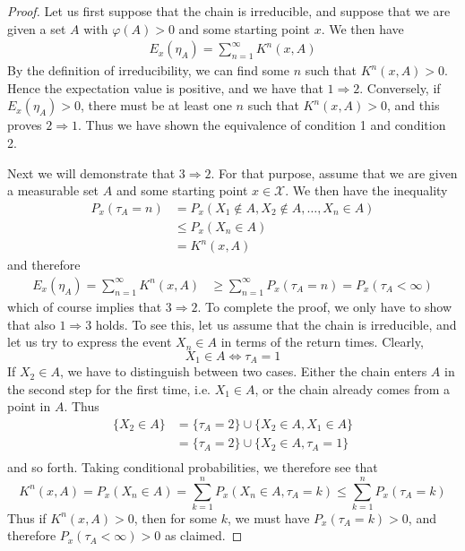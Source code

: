 \documentclass[a4paper, draft]{article}
\theoremstyle{own}
\theoremstyle{remark}
\begin{document}
\begin{proof}
	Let us first suppose that the chain is irreducible, and suppose that we are given a set $A$ with $\varphi(A) > 0$ and some starting point $x$. We then have
	\begin{align*}
	E_x(\eta_A) = \sum_{n=1}^\infty K^n(x,A)
	\end{align*}
	By the definition of irreducibility, we can find some $n$ such that $K^n(x,A) > 0$. Hence the expectation value is positive, and we have that $1 \Rightarrow 2$. Conversely,  if $E_x(\eta_A) > 0$, there must be at least one $n$ such that $K^n(x,A) > 0$, and this proves $2 \Rightarrow 1$. Thus we have shown the equivalence of condition 1 and condition 2.
	
	Next we will demonstrate that $3 \Rightarrow 2$. For that purpose, assume that we are given a measurable set $A$ and some starting point $x \in {\mathcal X}$. We then have the inequality
	\begin{align*}
	P_x(\tau_A = n) &= P_x(X_1 \notin A, X_2 \notin A, \dots, X_n \in A) \\
	& \leq P_x(X_n \in A) \\ &= K^n(x,A)
	\end{align*}
	and therefore
	\begin{align*}
	E_x(\eta_A) = \sum_{n=1}^\infty K^n(x,A) & \geq \sum_{n=1}^\infty  P_x(\tau_A = n) = P_x(\tau_A <\infty)
	\end{align*}
	which of course implies that $3 \Rightarrow 2$. To complete the proof, we only have to show that also $1 \Rightarrow 3$ holds. To see this, let us assume that the chain is irreducible, and let us try to express the event $X_n \in A$ in terms of the return times. Clearly,
	$$
	X_1 \in A \Leftrightarrow \tau_A = 1
	$$
	If $X_2 \in A$, we have to distinguish between two cases. Either the chain enters $A$ in the second step for the first time, i.e. $X_1 \in A$, or the chain already comes from a point in $A$. Thus
	\begin{align*}
	\{ X_2 \in A \} &= \{ \tau_A = 2 \} \cup \{ X_2 \in A, X_1 \in A \}   \\
	& = \{ \tau_A = 2 \} \cup  \{ X_2 \in A, \tau_A = 1 \}   \\
	\end{align*}
	and so forth. Taking conditional probabilities, we therefore see that
	$$
	K^n(x,A) = P_x(X_n \in A) = \sum_{k=1}^n P_x(X_n \in A, \tau_A = k) \leq \sum_{k=1}^n P_x(\tau_A = k)
	$$
	Thus if $K^n(x,A) > 0$, then for some $k$, we must have $P_x(\tau_A = k) > 0$, and therefore $P_x(\tau_A < \infty) > 0$ as claimed.
\end{proof}
\end{document}

